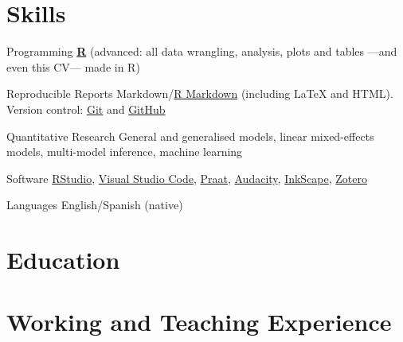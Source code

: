 \documentclass[11pt,a4paper,]{awesome-cv}
\begin{document}
\hypertarget{skills}{%
\section{Skills}\label{skills}}

\begin{cvskills}
  \cvskill
    {Programming}
    {\href{https://www.r-project.org/}{\textbf{R}} (advanced: all data wrangling, analysis, plots and tables —and even this CV— made in R)}

  \cvskill
    {Reproducible Reports}
    {Markdown/\href{https://rmarkdown.rstudio.com/}{R Markdown} (including {\selectfont\LaTeX} and HTML). Version control: \href{https://git-scm.com/}{Git} \faGit* and \href{https://github.com/JDLeongomez}{GitHub} \faGithub}

  \cvskill
    {Quantitative Research}
    {General and generalised models, linear mixed-effects models, multi-model inference, machine learning}

  \cvskill
    {Software}
    {\href{https://posit.co/products/open-source/rstudio/}{RStudio}, \href{https://code.visualstudio.com/}{Visual Studio Code}, \href{https://www.fon.hum.uva.nl/praat/}{Praat}, \href{https://www.audacityteam.org/}{Audacity}, \href{https://inkscape.org/}{InkScape}, \href{https://www.zotero.org/}{Zotero}}

  \cvskill
    {Languages}
    {English/Spanish (native)}
\end{cvskills}

\hypertarget{education}{%
\section{Education}\label{education}}

\begin{cventries}
    \vspace{-4.0mm}
    \vspace{-4.0mm}
    \vspace{-4.0mm}
\end{cventries}

\hypertarget{working-and-teaching-experience}{%
\section{Working and Teaching
Experience}\label{working-and-teaching-experience}}
\end{document}
